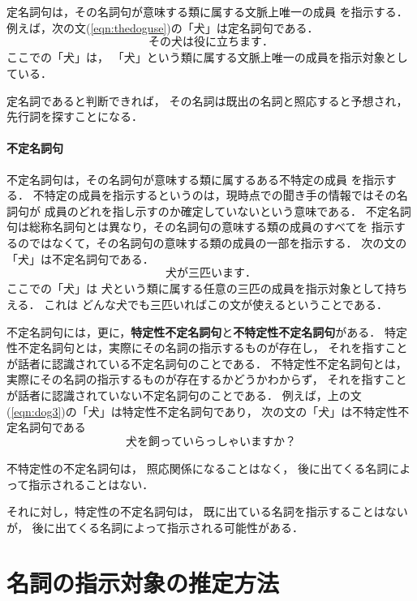 定名詞句は，その名詞句が意味する類に属する文脈上唯一の成員
を指示する．
例えば，次の文(\ref{eqn:thedoguse})の「犬」は定名詞句である．
\begin{equation}
その\underline{犬}は役に立ちます．
  \label{eqn:thedoguse}
\end{equation}
ここでの「犬」は，
「犬」という類に属する文脈上唯一の成員を指示対象としている．

定名詞であると判断できれば，
その名詞は既出の名詞と照応すると予想され，
先行詞を探すことになる．

\paragraph{不定名詞句}

不定名詞句は，その名詞句が意味する類に属するある不特定の成員
を指示する．
不特定の成員を指示するというのは，現時点での聞き手の情報ではその名詞句が
成員のどれを指し示すのか確定していないという意味である．
不定名詞句は総称名詞句とは異なり，その名詞句の意味する類の成員のすべてを
指示するのではなくて，その名詞句の意味する類の成員の一部を指示する．
次の文の「犬」は不定名詞句である．
\begin{equation}
\underline{犬}が三匹います．
  \label{eqn:dog3}
\end{equation}
ここでの「犬」は
犬という類に属する任意の三匹の成員を指示対象として持ちえる．
これは
どんな犬でも三匹いればこの文が使えるということである．

不定名詞句には，更に，{\bf 特定性不定名詞句}と{\bf 不特定性不定名詞句}がある．
特定性不定名詞句とは，実際にその名詞の指示するものが存在し，
それを指すことが話者に認識されている不定名詞句のことである．
不特定性不定名詞句とは，
実際にその名詞の指示するものが存在するかどうかわからず，
それを指すことが話者に認識されていない不定名詞句のことである．
例えば，上の文(\ref{eqn:dog3})の「犬」は特定性不定名詞句であり，
次の文の「犬」は不特定性不定名詞句である
\begin{equation}
\underline{犬}を飼っていらっしゃいますか？
  \label{eqn:dog_kau}
\end{equation}

不特定性の不定名詞句は，
照応関係になることはなく，
後に出てくる名詞によって指示されることはない．

それに対し，特定性の不定名詞句は，
既に出ている名詞を指示することはないが，
後に出てくる名詞によって指示される可能性がある．


\section{名詞の指示対象の推定方法}

